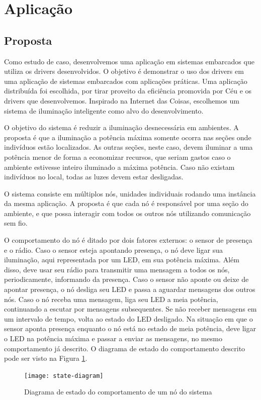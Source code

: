 \documentclass[11pt]{article}
\begin{document}
\section{Aplicação}
\subsection{Proposta}
\tab Como estudo de caso, desenvolvemos uma aplicação em sistemas embarcados que utiliza os drivers desenvolvidos. O objetivo é demonstrar o uso dos drivers em uma aplicação de sistemas embarcados com aplicações práticas. Uma aplicação distribuída foi escolhida, por tirar proveito da eficiência promovida por Céu e os drivers que desenvolvemos. Inspirado na Internet das Coisas, escolhemos um sistema de iluminação inteligente como alvo do desenvolvimento.
\par O objetivo do sistema é reduzir a iluminação desnecessária em ambientes. A proposta é que a iluminação a potência máxima somente ocorra nas seções onde indivíduos estão localizados. As outras seções, neste caso, devem iluminar a uma potência menor de forma a economizar recursos, que seriam gastos caso o ambiente estivesse inteiro iluminado a máxima potência. Caso não existam indivíduos no local, todas as luzes devem estar desligadas.
\par O sistema consiste em múltiplos nós, unidades individuais rodando uma instância da mesma aplicação. A proposta é que cada nó é responsável por uma seção do ambiente, e que possa interagir com todos os outros nós utilizando comunicação sem fio.
\par O comportamento do nó é ditado por dois fatores externos: o sensor de presença e o rádio. Caso o sensor esteja apontando presença, o nó deve ligar sua iluminação, aqui representada por um LED, em sua potência máxima. Além disso, deve usar seu rádio para transmitir uma mensagem a todos os nós, periodicamente, informando da presença. Caso o sensor não aponte ou deixe de apontar presença, o nó desliga seu LED e passa a aguardar mensagens dos outros nós. Caso o nó receba uma mensagem, liga seu LED a meia potência, continuando a escutar por mensagens subsequentes. Se não receber mensagens em um intervalo de tempo, volta ao estado do LED desligado. Na situação em que o sensor aponta presença enquanto o nó está no estado de meia potência, deve ligar o LED na potência máxima e passar a enviar as mensagens, no mesmo comportamento já descrito. O diagrama de estado do comportamento descrito pode ser visto na Figura \ref{state-diagram}.
\begin{figure}
    \centering
    \texttt{[image: state-diagram]}
    \caption{Diagrama de estado do comportamento de um nó do sistema}
    \label{state-diagram}
\end{figure}
\end{document}
